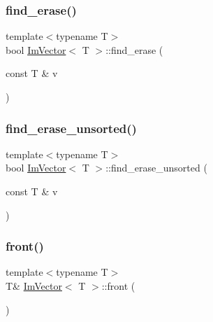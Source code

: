 \mbox{\label{structImVector_a4e9214ecaa413240f76223500dbed912}} 
\subsubsection{\texorpdfstring{find\+\_\+erase()}{find\_erase()}}
{\footnotesize\ttfamily template$<$typename T$>$ \\
bool \hyperlink{structImVector}{Im\+Vector}$<$ T $>$\+::find\+\_\+erase (\begin{DoxyParamCaption}\item[{const T \&}]{v }\end{DoxyParamCaption})\hspace{0.3cm}{\ttfamily [inline]}}

\mbox{\label{structImVector_a07f501e40783436616156682ec668327}} 
\subsubsection{\texorpdfstring{find\+\_\+erase\+\_\+unsorted()}{find\_erase\_unsorted()}}
{\footnotesize\ttfamily template$<$typename T$>$ \\
bool \hyperlink{structImVector}{Im\+Vector}$<$ T $>$\+::find\+\_\+erase\+\_\+unsorted (\begin{DoxyParamCaption}\item[{const T \&}]{v }\end{DoxyParamCaption})\hspace{0.3cm}{\ttfamily [inline]}}

\mbox{\label{structImVector_a34ba855bd3a1ee3e2af215c5ce7d6ddc}} 
\subsubsection{\texorpdfstring{front()}{front()}\hspace{0.1cm}{\footnotesize\ttfamily [1/2]}}
{\footnotesize\ttfamily template$<$typename T$>$ \\
T\& \hyperlink{structImVector}{Im\+Vector}$<$ T $>$\+::front (\begin{DoxyParamCaption}{ }\end{DoxyParamCaption})\hspace{0.3cm}{\ttfamily [inline]}}

